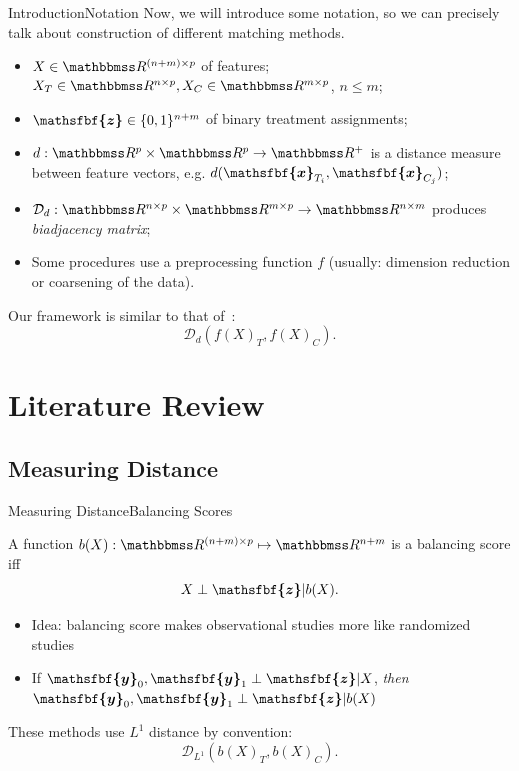 \documentclass[11pt, compress]{beamer}
\newcommand{\reals}{\ensuremath{\mathbbmss R}}
\renewcommand{\vec}[1]{\ensuremath{\boldsymbol{\mathsfbf{#1}}}}
\newcommand{\mat}[1]{\ensuremath{#1}}
\begin{document}
\begin{frame}{Introduction}{Notation}
	Now, we will introduce some notation, so we can precisely talk about construction of different matching methods.
	\begin{itemize}
		\item $\mat{X} \in \reals^{(n + m) \times p}$ of features; $\mat{X}_T \in \reals^{n \times p}, \mat{X}_C \in \reals^{m \times p}$, $n \leq m$;
		\item $\vec{z} \in \{0, 1\}^{n + m}$ of binary treatment assignments;
		\item $d: \reals^p \times \reals^p \to \reals^+$ is a distance measure between feature vectors, e.g. $d(\vec{x}_{T_{i}}, \vec{x}_{C_{j}})$;
		\item $\mathcal{D}_d : \reals^{n \times p} \times \reals^{m \times p} \to \reals^{n \times m}$ produces \emph{biadjacency matrix};
		\item Some procedures use a preprocessing function $f$ (usually: dimension reduction or coarsening of the data).
	\end{itemize}
	Our framework is similar to that of~\textcite{iacus_multivariate_2011}:
	\begin{equation}
		\mathcal{D}_d(f(\mat{X})_T, f(\mat{X})_C). \label{eqn:beamerabstractdistance}
	\end{equation}
\end{frame}

\section{Literature Review}

\subsection{Measuring Distance}
\begin{frame}{Measuring Distance}{Balancing Scores}
	\begin{definition}
		A function $b(\mat{X}): \reals^{(n + m) \times p} \mapsto \reals^{n + m}$ is a balancing score iff%
		\begin{equation}
			\mat{X} \perp \vec{z} | b(\mat{X}). \label{eqn:beamerdefbalance}%
		\end{equation}%
	\end{definition}%
	\begin{itemize}
		\item Idea: balancing score makes observational studies more like randomized studies
		\item If \( \vec{y}_0, \vec{y}_1 \perp \vec{z} | \mat{X} \), \emph{then} \( \vec{y}_0, \vec{y}_1 \perp \vec{z} | b(\mat{X}) \)
	\end{itemize}
	These methods use $L^1$ distance by convention:
	\begin{equation}
		\mathcal{D}_{L^1}(b(\mat{X})_T, b(\mat{X})_C). \label{eqn:beamerbalancingscoredistance}
	\end{equation}
\end{frame}
\end{document}

